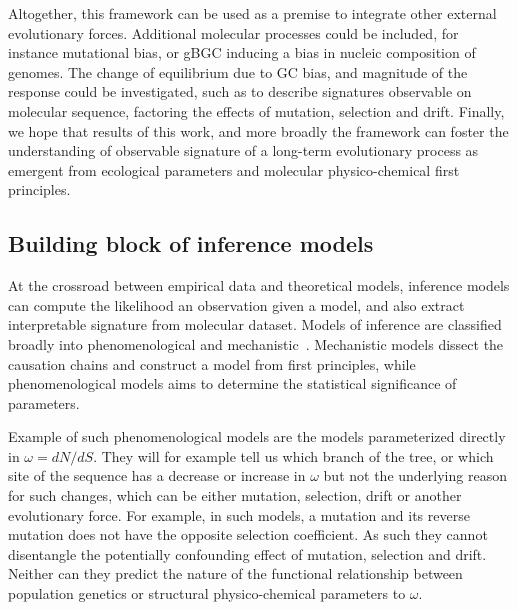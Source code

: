 Altogether, this framework can be used as a premise to integrate other external evolutionary forces.  %
Additional molecular processes could be included, for instance mutational bias, or \gls{gBGC} inducing a bias in nucleic composition of genomes. 
The change of equilibrium due to GC bias, and magnitude of the response could be investigated, such as to describe signatures observable on molecular sequence, factoring the effects of mutation, selection and drift.
Finally, we hope that results of this work, and more broadly the framework can foster the understanding of observable signature of a long-term evolutionary process as emergent from ecological parameters and molecular physico-chemical first principles.

\subsection{Building block of inference models}

At the crossroad between empirical data and theoretical models, inference models can compute the \gls{likelihood} an observation given a model, and also extract interpretable signature from molecular dataset.
Models of inference are classified broadly into phenomenological and mechanistic~\citep{Rodrigue2010a}.
Mechanistic models dissect the causation chains and construct a model from first principles, while phenomenological models aims to determine the statistical significance of parameters.

Example of such phenomenological models are the models parameterized directly in $\omega = dN/dS$.
They will for example tell us which branch of the tree, or which site of the sequence has a decrease or increase in $\omega$ but not the underlying reason for such changes, which can be either mutation, selection, drift or another evolutionary force.
For example, in such models, a mutation and its reverse mutation does not have the opposite selection coefficient.
As such they cannot disentangle the potentially confounding effect of mutation, selection and drift.
Neither can they predict the nature of the functional relationship between population genetics or structural physico-chemical parameters to $\omega$.

